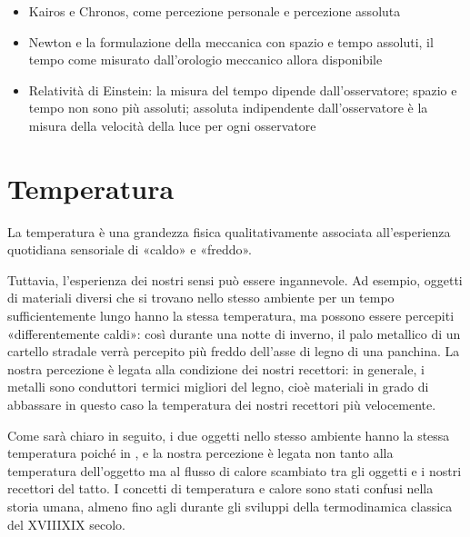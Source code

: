 \documentclass[letterpaper,10pt,italian]{jupyterBook}
\begin{document}
\sphinxAtStartPar
{}
\begin{itemize}
\item {} 
\sphinxAtStartPar
Kairos e Chronos, come percezione personale e percezione assoluta

\item {} 
\sphinxAtStartPar
Newton e la formulazione della meccanica con spazio e tempo assoluti, il tempo come misurato dall’orologio meccanico allora disponibile

\item {} 
\sphinxAtStartPar
Relatività di Einstein: la misura del tempo dipende dall’osservatore; spazio e tempo non sono più assoluti; assoluta \sphinxhyphen{} indipendente dall’osservatore \sphinxhyphen{} è la misura della velocità della luce per ogni osservatore

\end{itemize}

\sphinxstepscope


\section{Temperatura}
\label{\detokenize{ch/intro/physical_quantities-temperature:temperatura}}\label{\detokenize{ch/intro/physical_quantities-temperature:physics-hs-intro-physical-quantities-temperature}}\label{\detokenize{ch/intro/physical_quantities-temperature::doc}}
\sphinxAtStartPar
La temperatura è una grandezza fisica qualitativamente associata all’esperienza quotidiana sensoriale di «caldo» e «freddo».

\sphinxAtStartPar
Tuttavia, l’esperienza dei nostri sensi può essere ingannevole. Ad esempio, oggetti di materiali diversi che si trovano nello stesso ambiente \sphinxhyphen{} per un tempo sufficientemente lungo \sphinxhyphen{} hanno la stessa temperatura, ma possono essere percepiti «differentemente caldi»: così durante una notte di inverno, il palo metallico di un cartello stradale verrà percepito più freddo dell’asse di legno di una panchina. La nostra percezione è legata alla condizione dei nostri recettori: in generale, i metalli sono conduttori termici migliori del legno, cioè materiali in grado di abbassare \sphinxhyphen{} in questo caso \sphinxhyphen{} la temperatura dei nostri recettori più velocemente.

\sphinxAtStartPar
Come sarà chiaro in seguito, i due oggetti nello stesso ambiente hanno la stessa temperatura poiché in {\hyperref[\detokenize{ch/thermodynamics/foundation-experiments:physics-hs-thermodynamics-foundation-experiments-th-equilibrium}]{}}, e la nostra percezione è legata non tanto alla temperatura dell’oggetto ma al flusso di calore scambiato tra gli oggetti e i nostri recettori del tatto. I concetti di temperatura e calore sono stati confusi nella storia umana, almeno fino agli {\hyperref[\detokenize{ch/thermodynamics/foundation-experiments:physics-hs-thermodynamics-foundation-experiments-calorimetry}]{}} durante gli sviluppi della termodinamica classica del XVIII\sphinxhyphen{}XIX secolo.
\end{document}
